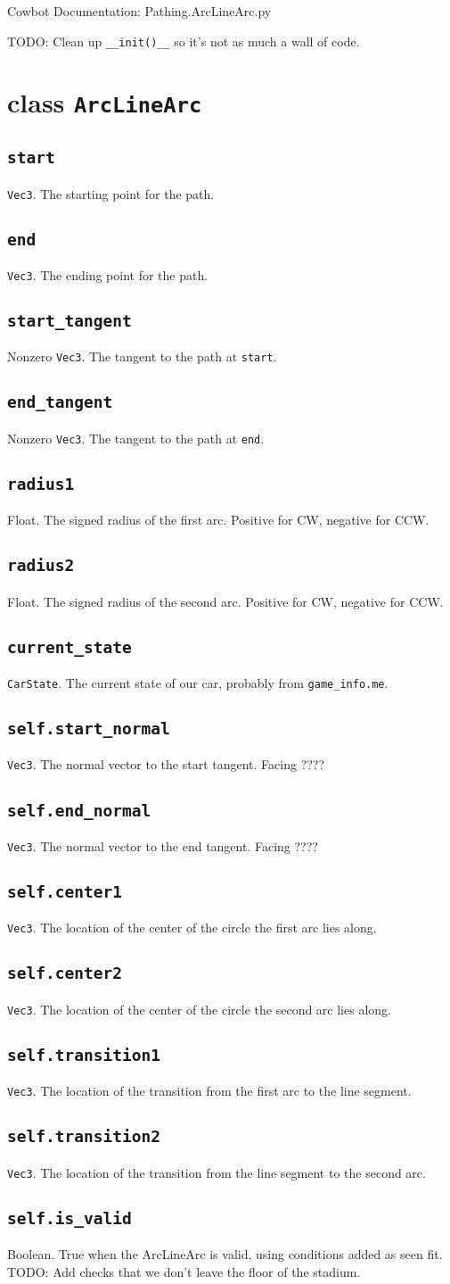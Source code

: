 \documentclass{article}
\newcommand{\class}[1]{\section{class \texttt{#1}}}
\newcommand{\attribute}[1]{\subsection{\texttt{self.#1}}}
\newcommand{\argumenta}[1]{\subsection{\texttt{#1}}}
\begin{document}
\begin{flushleft}

\begin{center}
  Cowbot Documentation: Pathing.ArcLineArc.py
\end{center}

TODO: Clean up \texttt{\_\_init()\_\_} so it's not as much a wall of code.


\class{ArcLineArc}
      {

        \argumenta{start}
                  {
                    \texttt{Vec3}.  The starting point for the path.
                  }
        \argumenta{end}
                  {
                    \texttt{Vec3}.  The ending point for the path.                    
                  }
        \argumenta{start\_tangent}
                  {
                    Nonzero \texttt{Vec3}.  The tangent to the path at \texttt{start}.
                  }
        \argumenta{end\_tangent}
                  {
                    Nonzero \texttt{Vec3}.  The tangent to the path at \texttt{end}.
                  }
        \argumenta{radius1}
                  {
                    Float.  The signed radius of the first arc.  Positive for CW, negative for CCW.
                  }
        \argumenta{radius2}
                  {
                    Float.  The signed radius of the second arc.  Positive for CW, negative for CCW.
                  }
        \argumenta{current\_state}
                  {
                    \texttt{CarState}.  The current state of our car, probably from \texttt{game\_info.me}.
                  }


        \attribute{start\_normal}
                  {
                    \texttt{Vec3}.  The normal vector to the start tangent.  Facing ????
                  }
        \attribute{end\_normal}
                  {
                    \texttt{Vec3}.  The normal vector to the end tangent.  Facing ????
                  }
        \attribute{center1}
                  {
                    \texttt{Vec3}. The location of the center of the circle the first arc lies along.
                  }
        \attribute{center2}
                  {
                    \texttt{Vec3}. The location of the center of the circle the second arc lies along.
                  }
        \attribute{transition1}
                  {
                    \texttt{Vec3}. The location of the transition from the first arc to the line segment.
                  }
        \attribute{transition2}
                  {
                    \texttt{Vec3}. The location of the transition from the line segment to the second arc.
                  }
        \attribute{is\_valid}
                  {
                   Boolean.  True when the ArcLineArc is valid, using conditions added as seen fit.  TODO: Add checks that we don't leave the floor of the stadium.
                  }

}
\end{flushleft}
\end{document}
